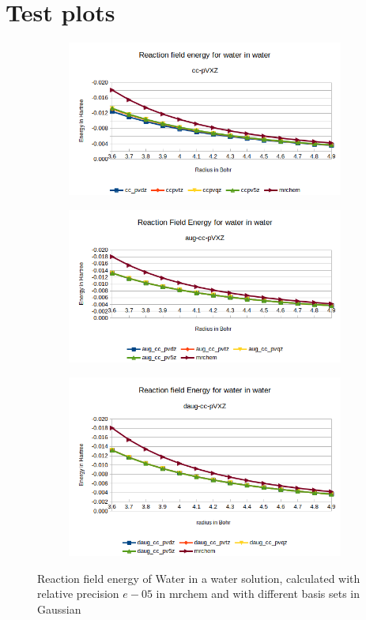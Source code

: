 \documentclass[../master_thesis.tex]{subfiles}
\begin{document}
\chapter{Test plots}\label{Figures}
\begin{figure}[hb!]
  \centering
  \begin{subfigure}[b]{0.75\linewidth}
    \includegraphics[width=\linewidth]{img/Erwat.png}
  \end{subfigure}
  \begin{subfigure}[b]{0.75\linewidth}
    \includegraphics[width=\linewidth]{img/Eraugwat.png}
  \end{subfigure}
  \begin{subfigure}[b]{0.75\linewidth}
    \includegraphics[width=\linewidth]{img/Erdaugwat.png}
  \end{subfigure}
  \caption{Reaction field energy of Water in a water solution, calculated with relative precision $e-05$ in mrchem
  and with different basis sets in Gaussian}
  \label{fig:watEnergyplots}
\end{figure}
\end{document}
